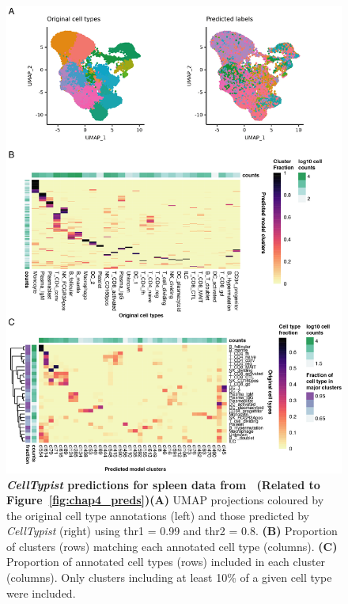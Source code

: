 \begin{figure}[pht!] 
\centering
\includegraphics[scale=0.81]{Appendix3/Figs/appB_spleen.png} %
\caption[\textit{CellTypist} predictions for spleen data from~\citep{madissoon_lung_2019}]{\textbf{\textit{CellTypist} predictions for spleen data from~\citep{madissoon_lung_2019} (Related to Figure~\ref{fig:chap4_preds})}\newline\textbf{(A)} UMAP projections coloured by the original cell type annotations (left) and those predicted by \textit{CellTypist} (right) using thr1 = 0.99 and thr2 = 0.8. \textbf{(B)} Proportion of clusters (rows) matching each annotated cell type (columns). \textbf{(C)} Proportion of annotated cell types (rows) included in each cluster (columns). Only clusters including at least 10\% of a given cell type were included.}
\label{fig:appB_spleen}
\end{figure}


